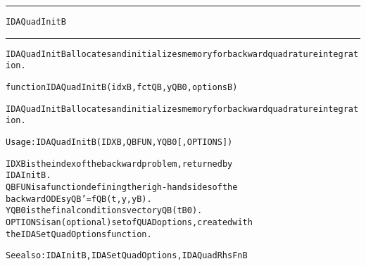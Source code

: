 \begin{samepage}
\hrule
\begin{center}
{\large \verb!IDAQuadInitB!}
\label{p:IDAQuadInitB}
\end{center}
\hrule\vspace{0.1in}



\begin{alltt}
IDAQuadInitB allocates and initializes memory for backward quadrature integration.
\end{alltt}

\end{samepage}



\begin{samepage}


\begin{alltt}
function IDAQuadInitB(idxB, fctQB, yQB0, optionsB) 
\end{alltt}

\end{samepage}



\begin{alltt}
IDAQuadInitB allocates and initializes memory for backward quadrature integration.

   Usage: IDAQuadInitB ( IDXB, QBFUN, YQB0 [, OPTIONS ] ) 

   IDXB     is the index of the backward problem, returned by
            IDAInitB.
   QBFUN    is a function defining the righ-hand sides of the
            backward ODEs yQB' = fQB(t,y,yB).
   YQB0     is the final conditions vector yQB(tB0).
   OPTIONS  is an (optional) set of QUAD options, created with
            the IDASetQuadOptions function. 

   See also: IDAInitB, IDASetQuadOptions, IDAQuadRhsFnB
\end{alltt}






\vspace{0.1in}